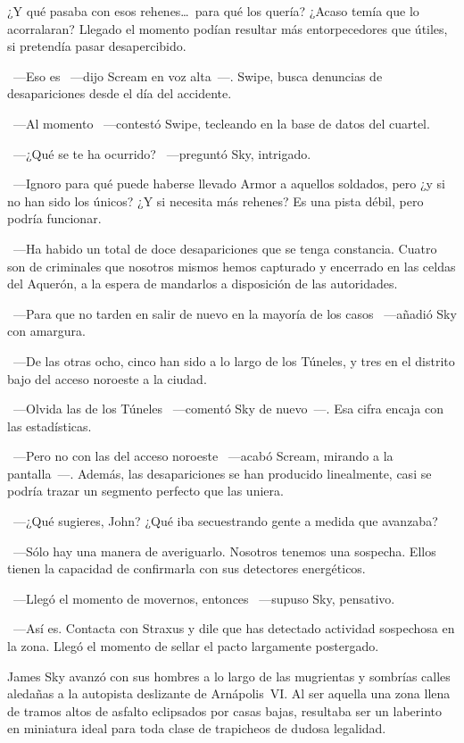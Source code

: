 ¿Y qué pasaba con esos rehenes\dots\ para qué los quería? ¿Acaso temía que lo acorralaran? Llegado el momento podían resultar más entorpecedores que útiles, si pretendía pasar desapercibido.

~---Eso es ~---dijo Scream en voz alta~---. Swipe, busca denuncias de desapariciones desde el día del accidente.

~---Al momento ~---contestó Swipe, tecleando en la base de datos del cuartel.

~---¿Qué se te ha ocurrido? ~---preguntó Sky, intrigado.

~---Ignoro para qué puede haberse llevado Armor a aquellos soldados, pero ¿y si no han sido los únicos? ¿Y si necesita más rehenes? Es una pista débil, pero podría funcionar.

~---Ha habido un total de doce desapariciones que se tenga constancia. Cuatro son de criminales que nosotros mismos hemos capturado y encerrado en las celdas del Aquerón, a la espera de mandarlos a disposición de las autoridades.

~---Para que no tarden en salir de nuevo en la mayoría de los casos ~---añadió Sky con amargura.

~---De las otras ocho, cinco han sido a lo largo de los Túneles, y tres en el distrito bajo del acceso noroeste a la ciudad.

~---Olvida las de los Túneles ~---comentó Sky de nuevo~---. Esa cifra encaja con las estadísticas.

~---Pero no con las del acceso noroeste ~---acabó Scream, mirando a la pantalla~---. Además, las desapariciones se han producido linealmente, casi se podría trazar un segmento perfecto que las uniera.

~---¿Qué sugieres, John? ¿Qué iba secuestrando gente a medida que avanzaba?

~---Sólo hay una manera de averiguarlo. Nosotros tenemos una sospecha. Ellos tienen la capacidad de confirmarla con sus detectores energéticos.

~---Llegó el momento de movernos, entonces ~---supuso Sky, pensativo.

~---Así es. Contacta con Straxus y dile que has detectado actividad sospechosa en la zona. Llegó el momento de sellar el pacto largamente postergado.

\parbreak
James Sky avanzó con sus hombres a lo largo de las mugrientas y sombrías calles aledañas a la autopista deslizante de Arnápolis~VI. Al ser aquella una zona llena de tramos altos de asfalto eclipsados por casas bajas, resultaba ser un laberinto en miniatura ideal para toda clase de trapicheos de dudosa legalidad.

